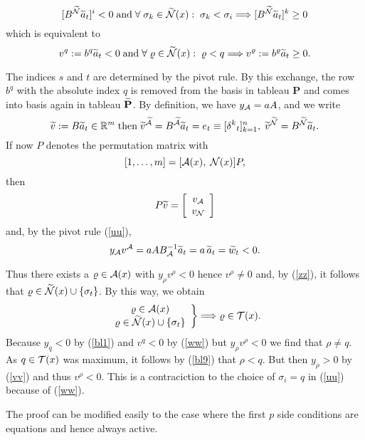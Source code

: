 %
\[
[B^{\wi{\N}}\wi{a}_t]^i < 0 \; \mbox{and} \;
\forall \; \sigma_k \in \wi{\N}(x): \; \sigma _k < \sigma _i
\Longrightarrow [B^{\wi{\N}}\wi{a}_t]^k \geq 0
\]
which is equivalent to
\begin{equation} \label{ww}
v^q := b^q\wi{a}_t < 0 \; \mbox{and} \; \forall \; \rho  \in \wi{\N}(x): \;
\rho  < q  \Longrightarrow v^{\rho } := b^{\rho }\wi{a}_t \geq 0 .
\end{equation}
\par
The indices $s$ and $t$ are determined by the pivot rule.  By this exchange,
the row $b^q$ with the absolute index $q$ is removed from the basis in
tableau {\bf P} and comes into basis again in tableau $\wi{{\bf P}}$.  By
definition, we have $y_{\A} = aA$, and we write
%
\begin{equation} \label{zz}
\wi{v} := B\wi{a}_t \in \Bbb{R}^m \; \mbox{then} \;
\wi{v}^{\wi{\A}} = B^{\wi{\A}}\wi{a}_t = e_t \equiv [\delta ^k{}_t]_{k=1}^n,
\; \wi{v}^{\wi{\N}} = B^{\wi{\N}}\wi{a}_t.
\end{equation}
If now $P$ denotes the permutation matrix with
\[
[1, \ldots ,m] = [\A(x), \; \N(x)]P,
\]
then
\[
P\wi{v} = \ba{[}{c} v_{\A}\\ v_{\N} \ea{]}
\]
and, by the pivot rule (\ref{uu}),
\[
y_{\A}v^{\A} = aAB_{\A}^{-1}\wi{a}_t = a \, \wi{a}_t = \wi{w}_t < 0.
\]
\par
Thus there exists a $\rho \in \A(x)$ with $y_{\rho }v^{\rho } < 0$ hence
$v^{\rho } \neq 0$ and, by (\ref{zz}), it follows that $\rho \in \wi{\N}(x)
\cup \{\sigma _t\}$.  By this way, we obtain
%
\begin{equation} \label{bl9}
\ba{.}{c} \rho  \in \A(x)\\ \rho  \in \wi{\N}(x) \cup \{\sigma_t\}
\ea{\}} \Longrightarrow \rho  \in \T(x).
\end{equation}
%
Because $y_q < 0$ by (\ref{bl1}) and $v^q < 0$ by (\ref{ww}) but $y_{\rho
}v^{\rho } < 0$ we find that $\rho \neq q$.  As $q \in\T (x)$ was maximum, it
follows by (\ref{bl9}) that $\rho < q$.  But then $y_{\rho} > 0$ by (\ref{vv})
and thus $v^{\rho } < 0$.  This is a contraciction to the choice of $\sigma _i
= q$ in (\ref{uu}) because of (\ref{ww}).
\par
The proof can be modified easily to the case where the first $p$ side
conditions are equations and hence always active.
